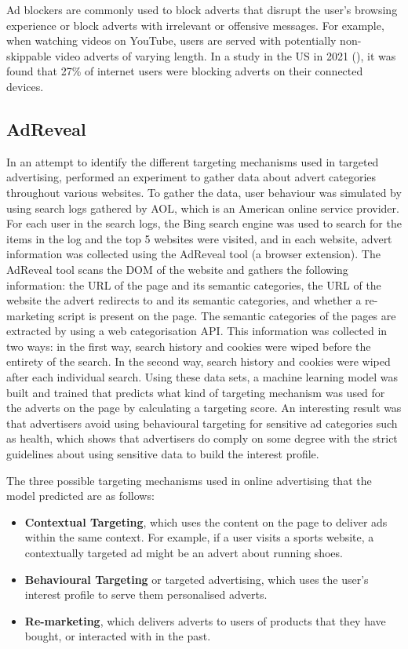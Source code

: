 \documentclass{l4proj}
\begin{document}
Ad blockers are commonly used to block adverts that disrupt the user's browsing experience or block adverts with irrelevant or offensive messages. For example, when watching videos on YouTube, users are served with potentially non-skippable video adverts of varying length. In a study in the US in 2021 (\cite{stats}), it was found that 27\% of internet users were blocking adverts on their connected devices. 

\subsection{AdReveal}
In an attempt to identify the different targeting mechanisms used in targeted advertising, \cite{Liu2013} performed an experiment to gather data about advert categories throughout various websites. To gather the data, user behaviour was simulated by using search logs gathered by AOL, which is an American online service provider. 
For each user in the search logs, the Bing search engine was used to search for the items in the log and the top 5 websites were visited, and in each website, advert information was collected using the AdReveal tool (a browser extension). The AdReveal tool scans the DOM of the website and gathers the following information: the URL of the page and its semantic categories, the URL of the website the advert redirects to and its semantic categories, and whether a re-marketing script is present on the page. The semantic categories of the pages are extracted by using a web categorisation API. 
This information was collected in two ways: in the first way, search history and cookies were wiped before the entirety of the search. In the second way, search history and cookies were wiped after each individual search. Using these data sets, a machine learning model was built and trained that predicts what kind of targeting mechanism was used for the adverts on the page by calculating a targeting score. An interesting result was that advertisers avoid using behavioural targeting for sensitive ad categories such as health, which shows that advertisers do comply on some degree with the strict guidelines about using sensitive data to build the interest profile.

The three possible targeting mechanisms used in online advertising that the model predicted are as follows:
\begin{itemize}
    \item \textbf{Contextual Targeting}, which uses the content on the page to deliver ads within the same context. For example, if a user visits a sports website, a contextually targeted ad might be an advert about running shoes.
    \item \textbf{Behavioural Targeting} or targeted advertising, which uses the user's interest profile to serve them personalised adverts.
    \item \textbf{Re-marketing}, which delivers adverts to users of products that they have bought, or interacted with in the past.
\end{itemize}
\end{document}
